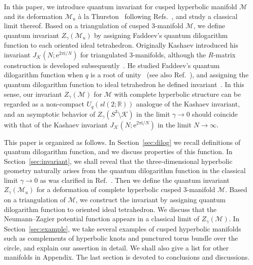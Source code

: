 \documentclass[12pt,reqno]{amsart}
\numberwithin{equation}{section}
\newcommand{\I}{\mathrm{i}}
\newcommand{\E}{\mathrm{e}}
\begin{document}
In this paper,
we introduce quantum invariant for cusped hyperbolic manifold $\mathcal{M}$ and
its deformation $\mathcal{M}_u$ {\`{a}} la
Thurston~\cite{WPThurs80Lecture}
following
Refs.~, and study a classical
limit thereof.
Based  on  a triangulation of cusped  3-manifold $\mathcal{M}$, 
we define quantum invariant $Z_\gamma(\mathcal{M}_u)$
by assigning Faddeev's quantum dilogarithm function to  each oriented
ideal tetrahedron.
Originally Kashaev introduced  his invariant
$J_\mathcal{K}\left(
  N ; \E^{2 \pi \I/N}
\right)$ for triangulated
3-manifolds, although the $R$-matrix construction is developed
subsequently~\cite{Kasha95}.
He  studied Faddeev's  quantum dilogarithm function when $q$ is a root
of
unity~\cite{FaddKash94,Kasha94a}
(see also Ref.~),
and assigning the quantum dilogarithm function to ideal tetrahedron
he defined invariant~\cite{Kasha95,RKasha95b}.
In this sense,
our invariant $Z_\gamma(\mathcal{M})$ for $\mathcal{M}$ with complete
hyperbolic structure 
can be regarded as  a non-compact
$U_q(sl(2;\mathbb{R}))$
analogue of the Kashaev invariant,
and an asymptotic behavior of $Z_\gamma(S^3 \setminus \mathcal{K})$ in
the limit
$\gamma\to 0$ should coincide with that of the Kashaev invariant
$J_{\mathcal{K}}\left(N; \E^{2 \pi \I/N}\right)$
in
the limit $N\to\infty$.

This paper is organized as follows.
In Section~\ref{sec:dilog} we recall definitions of quantum
dilogarithm function, and
we discuss properties of this function.
In Section~\ref{sec:invariant},
we shall reveal that the
three-dimensional hyperbolic geometry naturally arises from the
quantum dilogarithm function in the
classical limit $\gamma\to 0$
as was clarified in Ref.~.
Then we define the quantum invariant
$Z_\gamma(\mathcal{M}_u)$ for a deformation of complete hyperbolic
cusped 3-manifold $\mathcal{M}$.
Based on a triangulation of $\mathcal{M}$, we construct the invariant
by assigning quantum dilogarithm function to oriented ideal
tetrahedron.
We discuss that the Neumann--Zagier potential function  appears
in a
classical limit of $Z_\gamma(\mathcal{M})$.
In Section~\ref{sec:example}, we take several examples of cusped
hyperbolic manifolds such as complements of hyperbolic knots and
punctured torus bundle over the circle,
and explain our assertion in detail.
We shall also give a list for other manifolds in Appendix.
The last section is devoted to conclusions and discussions.



\end{document}
